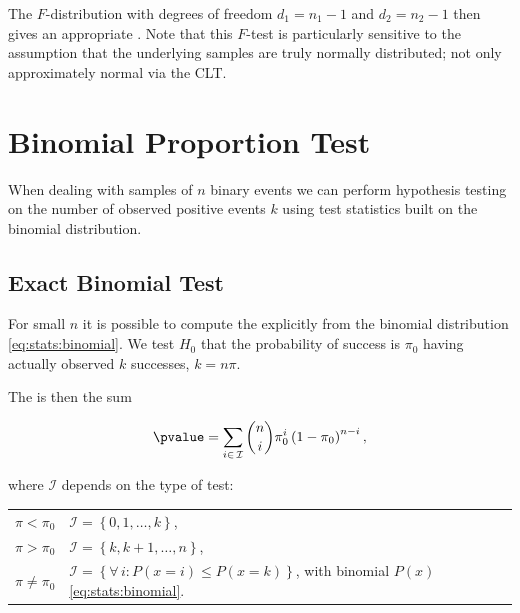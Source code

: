 The $F$-distribution with degrees of freedom $d_{1} = n_{1}-1$ and $d_{2} = n_{2}-1$
then gives an appropriate \pvalue.
Note that this $F$-test is particularly sensitive to the assumption that
the underlying samples are truly normally distributed;
not only approximately normal via the CLT.

\section{Binomial Proportion Test}
\label{hypo:binomial_test}

When dealing with samples of $n$ binary events we can perform hypothesis testing
on the number of observed positive events $k$
using test statistics built on the binomial distribution.

\subsection{Exact Binomial Test}
\label{hypo:binomial_test:exact}

For small $n$ it is possible to compute the \pvalue
explicitly from the binomial distribution \cref{eq:stats:binomial}.
We test $H_{0}$ that the probability of success is $\pi_{0}$
having actually observed $k$ successes, $k = n \pi$.

The \pvalue is then the sum

\begin{equation}\label{eq:hypo:binomial_test:exact}
\pvalue = \sum_{i \in \, \mathcal{I}} {n \choose i}\pi_{0}^{i} \left(1-\pi_{0}\right)^{n-i},
\end{equation}

\noindent where $\mathcal{I}$ depends on the type of test:

\begin{table}[H]
\centering
\begin{tabular}{l|l}
$\pi < \pi_{0}$ & $\mathcal{I} = \left\{0, 1, \ldots, k\right\}$, \\
$\pi > \pi_{0}$ & $\mathcal{I} = \left\{k, k+1, \ldots, n\right\}$, \\
$\pi \neq \pi_{0}$ & $\mathcal{I} = \left\{\forall \, i: P\left(x=i\right) \leq P\left(x = k\right)\right\}$, with binomial $P\left(x\right)$ \cref{eq:stats:binomial}.
\end{tabular}
\end{table}

